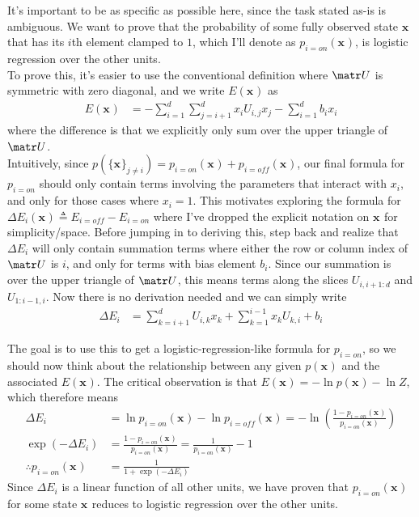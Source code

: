 \documentclass[11pt]{article}
\renewcommand\vec[2][]{\bm{#2}_{#1}}
\begin{document}
\begin{example}
	\tiny
	It's important to be as specific as possible here, since the task stated as-is is ambiguous. We want to prove that the probability of some fully observed state $\vec x$ that has its $i$th element clamped to $1$, which I'll denote as $p_{i=on}(\vec x)$, is logistic regression over the other units.\\
	
	To prove this, it's easier to use the conventional definition where $\matr U$ is symmetric with zero diagonal, and we write $E(\vec x)$ as
	\begin{align}
		E(\vec x)
			&= - \sum_{i=1}^{d} \sum_{j=i+1}^{d} x_i U_{i,j} x_j - \sum_{i=1}^{d} b_i x_i
	\end{align}
	where the difference is that we explicitly only sum over the upper triangle of $\matr U$. \\
	
	Intuitively, since $p(\{ \vec x \}_{j \ne i}) = p_{i=on}(\vec x) + p_{i=off}(\vec x)$, our final formula for $p_{i=on}$ should only contain terms involving the parameters that interact with $x_i$, and only for those cases where $x_i=1$. This motivates exploring the formula for $\Delta E_i (\vec x) \triangleq E_{i=off} - E_{i=on}$ where I've dropped the explicit notation on $\vec x$ for simplicity/space. Before jumping in to deriving this, step back and realize that $\Delta E_i$ will only contain summation terms where either the row or column index of $\matr U$ is $i$, and only for terms with bias element $b_i$. Since our summation is over the upper triangle of $\matr U$, this means terms along the slices $U_{i, i+1:d}$ and $U_{1:i-1, i}$. Now there is no derivation needed and we can simply write
	\begin{align}
		\Delta E_i 
			&= \sum_{k = i + 1}^{d} U_{i, k} x_k + \sum_{k = 1}^{i-1} x_k U_{k, i} + b_i 
	\end{align}
	
	The goal is to use this to get a logistic-regression-like formula for $p_{i=on}$, so we should now think about the relationship between any given $p(\vec x)$ and the associated $E(\vec x)$. The critical observation is that $E(\vec x) = -\ln p(\vec x) - \ln Z$, which therefore means
	\begin{align}
		\Delta E_i
			&= \ln p_{i=on}(\vec x) - \ln p_{i=off}(\vec x)
			= - \ln\left( \frac{ 1 - p_{i=on}(\vec x)  }{p_{i=on}(\vec x)}  \right) \\
		\exp(- \Delta E_i)
			&=  \frac{ 1 - p_{i=on}(\vec x)  }{p_{i=on}(\vec x)} =  \frac{ 1 }{p_{i=on}(\vec x)} - 1 \\
		\therefore p_{i=on}(\vec x)
			&= \frac{ 1 }{ 1 +  \exp(- \Delta E_i) }
	\end{align}
	Since $\Delta E_i$ is a linear function of all other units, we have proven that $p_{i=on}(\vec x)$ for some state $\vec x$ reduces to logistic regression over the other units. 
\end{example}
\end{document}
